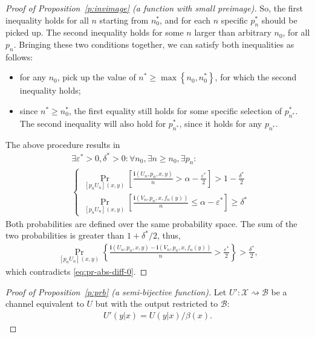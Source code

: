 \documentclass[journal, twocol]{IEEEtran}
\newcommand{\mB}{{\mathcal{B}}}
\newcommand{\mX}{{\mathcal{X}}}
\newcommand{\set}[1]{{\left\{{#1}\right\}}}
\newcommand{\br}[1]{{\left({#1}\right)}}
\newcommand{\brsq}[1]{{\left[{#1}\right]}}
\newcommand{\ve}{\varepsilon}
\newcommand{\tosq}{\rightsquigarrow}
\newcommand{\bi}{\mathbf{i}}
\newcommand{\pW}[2]{[{#1}{#2}]}
\begin{document}
\begin{appendices}
\begin{proof}[Proof of Proposition~\ref{p:invimage} (a function with small preimage)]
So, the first inequality holds for all $n$ starting from $n^*_0$, and for each $n$ specific $p_n^*$ should be picked up.
The second inequality holds for some $n$ larger than arbitrary $n_0$, for all $p_n$.
Bringing these two conditions together, we can satisfy both inequalities as follows:
\begin{itemize}
\item for any $n_0$, pick up the value of $n^*\geq \max\set{n_0,n^*_0}$, for which the second inequality holds;
\item since $n^*\geq n^*_0$, the first equality still holds for some specific selection of $p^*_{n^*}$. The second inequality will also hold for $p_{n^*}^*$, since it holds for any $p_{n^*}$.	
\end{itemize}
The above procedure results in
\begin{align}
&\exists \ve^*>0,\delta^*>0: \forall n_0, \exists n\geq n_0, \exists p_n:
\nonumber\\&
\begin{cases}
\displaystyle \Pr_{\pW{p_n}{U_n}(x,y)}\brsq{\frac{\bi(U_n,p_n,x,y)}{n}> \alpha-\frac{\ve^*}{2}}>1-\frac{\delta^*}{2}
\\
\displaystyle \Pr_{\pW{p_n}{U_n}(x,y)}\brsq{\frac{\bi(V_{n},p_{n},x,f_{n}(y))}{n}\leq \alpha-\ve^*}\geq\delta^*
\end{cases}
\end{align}
Both probabilities are defined over the same probability space.
The sum of the two probabilities is greater than $1+\delta^*/2$, thus,
\begin{align*}
\Pr_{\pW{p_n}{U_n}(x,y)}\set{\frac{\bi\br{U_n,p_n,x,y}-\bi\br{V_{n},p_{n},x,f_{n}(y)}}{n}\!>\!\frac{\ve^*}{2}}\!>\!\frac{\delta^*}{2},
\end{align*}
which contradicts \eqref{eq:pr-abs-diff-0}.
\end{proof}

\begin{proof}[Proof of Proposition~\ref{p:prb} (a semi-bijective function)]
Let $U':\mX\tosq\mB$ be a channel equivalent to $U$ but with the output restricted to $\mB$:
\begin{align}
U'(y|x)={U(y|x)}/{\beta(x)}.
\end{align}


\end{proof}
\end{appendices}
\end{document}
